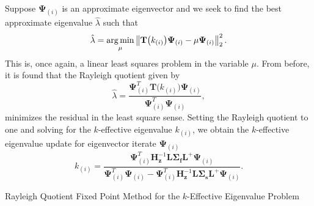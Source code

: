 Suppose $\mathbf{\Psi}_{(i)}$ is an approximate eigenvector and we seek to find the best approximate eigenvalue $\hat{\lambda}$ such that
\begin{equation}
\hat{\lambda} = \operatorname*{arg\,min}_{\mu} \left\lVert\mathbf{T}\big (k_{(i)} \big ) \mathbf{\Psi}_{(i)} - \mu \mathbf{\Psi}_{(i)}\right\rVert_{2}^{2}. 
\end{equation}
This is, once again, a linear least squares problem in the variable $\mu$. From before, it is found that the Rayleigh quotient given by
\begin{equation}
	\hat{\lambda} = \frac{\mathbf{\Psi}^{T}_{(i)} \mathbf{T}\big (k_{(i)} \big ) \mathbf{\Psi}_{(i)}}{\mathbf{\Psi}^{T}_{(i)}\mathbf{\Psi}_{(i)}},
\end{equation}
minimizes the residual in the least square sense. Setting the Rayleigh quotient to one and solving for the $k$-effective eigenvalue $k_{(i)}$, we obtain the $k$-effective eigenvalue update for eigenvector iterate $\mathbf{\Psi}_{(i)}$
\begin{equation}
	k_{(i)} = \frac{\mathbf{\Psi}^{T}_{(i)} \mathbf{H}_{\mathbf{z}}^{-1} \mathbf{L} \mathbf{\Sigma_{f}} \mathbf{L}^{+} \mathbf{\Psi}_{(i)}}{\mathbf{\Psi}^{T}_{(i)}\mathbf{\Psi}_{(i)} - \mathbf{\Psi}^{T}_{(i)} \mathbf{H}_{\mathbf{z}}^{-1} \mathbf{L} \mathbf{\Sigma_{s}} \mathbf{L}^{+} \mathbf{\Psi}_{(i)}}.
\end{equation}

\begin{algorithm}[t]
	\caption{Rayleigh Quotient Fixed Point Method for the $k$-Effective Eigenvalue Problem}
	\label{algo:alpha}
	\begin{algorithmic}
		\ENDWHILE
	\end{algorithmic}
\end{algorithm}